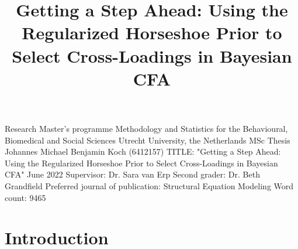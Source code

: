 \documentclass[
  man, donotrepeattitle,floatsintext]{apa6}
\title{Getting a Step Ahead: Using the Regularized Horseshoe Prior to Select Cross-Loadings in Bayesian CFA}
\author{\phantom{0}}
\date{}
\affiliation{\phantom{0}}
\begin{document}
\maketitle

\thispagestyle{empty}

\begin{large}
\noindent Research Master's programme 
Methodology and Statistics for the Behavioural, Biomedical and Social Sciences \newline
Utrecht University, the Netherlands \newline
\newline
\newline
\newline
\newline
MSc Thesis Johannes Michael Benjamin Koch (6412157) 
\newline
TITLE: "Getting a Step Ahead: Using the Regularized Horseshoe Prior to Select Cross-Loadings in Bayesian CFA"
\newline
June 2022 
\newline
\newline
\newline
\newline
\newline
Supervisor:\newline
Dr. Sara van Erp \newline
\newline
\newline
Second grader: \newline
Dr. Beth Grandfield
\newline
\newline
\newline
\newline
Preferred journal of publication: Structural Equation Modeling
\newline
Word count: 9465
\newline
\end{large}
\addtocounter{page}{-1}
\clearpage
\pagebreak

\pagestyle{plain}

\clearpage

\hypertarget{introduction}{%
\section{Introduction}\label{introduction}}
\end{document}
